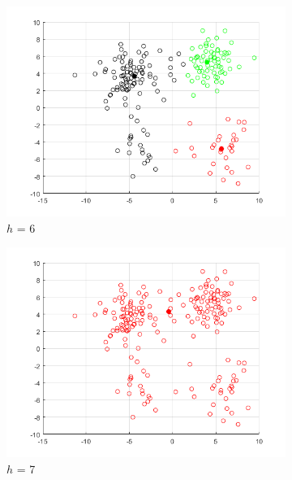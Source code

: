 \documentclass[12pt]{article}
\begin{document}
\begin{figure}[H]
\medskip
\begin{subfigure}{0.25\textwidth}
  \includegraphics[width=\linewidth]{figs/1-b-meanshift-a-6.png}
  \caption{$h$ = 6}
  \label{fig:4}
\end{subfigure}\hfil %
\begin{subfigure}{0.25\textwidth}
  \includegraphics[width=\linewidth]{figs/1-b-meanshift-a-1.png}
  \caption{$h$ = 7}
  \label{fig:5}
\end{subfigure}\hfil %
\begin{subfigure}{0.25\textwidth}

\end{subfigure}
\end{figure}
\end{document}
